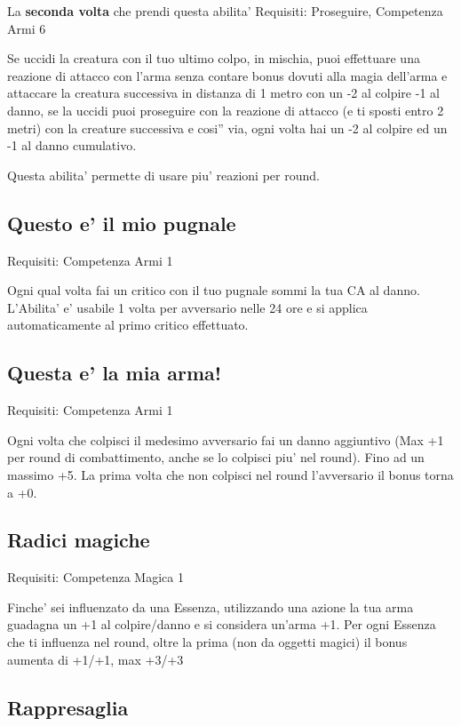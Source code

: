 \documentclass[a4paper,11pt,twoside,openany]{book}
\begin{document}
La \textbf{seconda volta} che prendi questa abilita' Requisiti: Proseguire, Competenza Armi 6

Se uccidi la creatura con il tuo ultimo colpo, in mischia, puoi effettuare una reazione di attacco con l'arma senza contare bonus dovuti alla magia dell'arma e attaccare la creatura successiva in distanza di 1 metro con un -2 al colpire -1 al danno, se la uccidi puoi proseguire con la reazione di attacco (e ti sposti entro 2 metri) con la creature successiva e cosi'' via, ogni volta hai un -2 al colpire ed un -1 al danno cumulativo.

Questa abilita' permette di usare piu' reazioni per round.

\subsection{Questo e' il mio pugnale}

Requisiti: Competenza Armi 1

Ogni qual volta fai un critico con il tuo pugnale sommi la tua CA al danno. L'Abilita' e' usabile 1 volta per avversario nelle 24 ore e si applica automaticamente al primo critico effettuato.

\subsection{Questa e' la mia arma!}

Requisiti: Competenza Armi 1

Ogni volta che colpisci il medesimo avversario fai un danno aggiuntivo (Max +1 per round di combattimento, anche se lo colpisci piu' nel round). Fino ad un massimo +5. La prima volta che non colpisci nel round l'avversario il bonus torna a +0.

\subsection{Radici magiche}

Requisiti: Competenza Magica 1

Finche' sei influenzato da una Essenza, utilizzando una azione la tua arma guadagna un +1 al colpire/danno e si considera un'arma +1. Per ogni Essenza che ti influenza nel round, oltre la prima (non da oggetti magici) il bonus aumenta di +1/+1, max +3/+3

\subsection{Rappresaglia}
\end{document}
